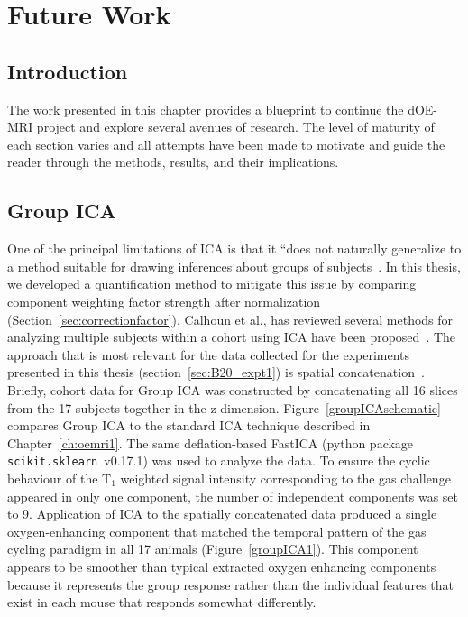 
\chapter{Future Work}
\label{ch:futurework}

\section{Introduction}

The work presented in this chapter provides a blueprint to continue the \acs{dOE-MRI} project and explore several avenues of research.
The level of maturity of each section varies and all attempts have been made to motivate and guide the reader through the methods, results, and their implications.

\section{Group ICA}

One of the principal limitations of \acs{ICA} is that it ``does not naturally generalize to a method suitable for drawing inferences about groups of subjects~\cite{Calhoun:2009jr}.
In this thesis, we developed a quantification method to mitigate this issue by comparing component weighting factor strength after normalization (Section~\ref{sec:correctionfactor}).
Calhoun et al., has reviewed several methods for analyzing multiple subjects within a cohort using \acs{ICA} have been proposed~\cite{Calhoun:2009jr}.
The approach that is most relevant for the data collected for the experiments presented in this thesis (section~\ref{sec:B20_expt1}) is spatial concatenation~\cite{Calhoun:2001jx}.
Briefly, cohort data for Group ICA was constructed by concatenating all 16 slices from the 17 subjects together in the z-dimension.
Figure~\ref{groupICAschematic} compares Group ICA to the standard ICA technique described in Chapter~\ref{ch:oemri1}.
The same deflation-based \acs{FastICA} (python package \texttt{scikit.sklearn}~v0.17.1) was used to analyze the data.
To ensure the cyclic behaviour of the T$_1$ weighted signal intensity corresponding to the gas challenge appeared in only one component, the number of independent components was set to 9.
Application of \acs{ICA} to the spatially concatenated data produced a single oxygen-enhancing component that matched the temporal pattern of the gas cycling paradigm in all 17 animals (Figure~\ref{groupICA1}). 
This component appears to be smoother than typical extracted oxygen enhancing components because it represents the group response rather than the individual features that exist in each mouse that responds somewhat differently.


